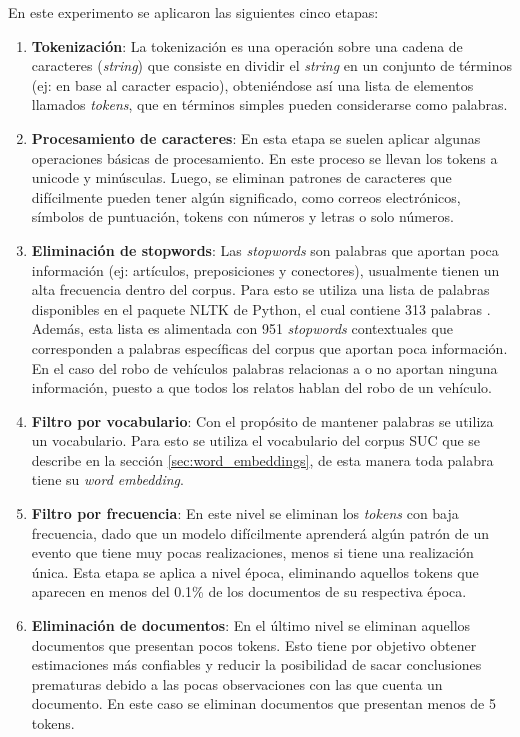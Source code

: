 En este experimento se aplicaron las siguientes cinco etapas:
\begin{enumerate}
  \item \textbf{Tokenización}: La tokenización es una operación sobre una cadena de caracteres (\textit{string}) que consiste en dividir el \textit{string} en un conjunto de términos (ej: en base al caracter espacio), obteniéndose así una lista de elementos llamados \textit{tokens}, que en términos simples pueden considerarse como palabras.
\item \textbf{Procesamiento de caracteres}: En esta etapa se suelen aplicar algunas operaciones básicas de procesamiento. En este proceso se llevan los tokens a unicode y minúsculas. Luego, se eliminan patrones de caracteres que difícilmente pueden tener algún significado, como correos electrónicos, símbolos de puntuación, tokens con números y letras o solo números. 
\item \textbf{Eliminación de stopwords}: Las \textit{stopwords} \citep{wilbur1992automatic} son palabras que aportan poca información (ej: artículos, preposiciones y conectores), usualmente tienen un alta frecuencia dentro del corpus. Para esto se utiliza una lista de palabras disponibles en el paquete NLTK de Python, el cual contiene 313 palabras \citep{bird2009natural}. Además, esta lista es alimentada con 951 \textit{stopwords} contextuales que corresponden a palabras específicas del corpus que aportan poca información. En el caso del robo de vehículos palabras relacionas a  o  no aportan ninguna información, puesto a que todos los relatos hablan del robo de un vehículo. 
\item \textbf{Filtro por vocabulario}: Con el propósito de mantener palabras  se utiliza un vocabulario. Para esto se utiliza el vocabulario del corpus SUC que se describe en la sección \ref{sec:word_embeddings}, de esta manera toda palabra tiene su \textit{word embedding}. 
\item \textbf{Filtro por frecuencia}: En este nivel se eliminan los \textit{tokens} con baja frecuencia, dado que un modelo difícilmente aprenderá algún patrón de un evento que tiene muy pocas realizaciones, menos si tiene una realización única. Esta etapa se aplica a nivel época, eliminando aquellos tokens que aparecen en menos del 0.1\% de los documentos de su respectiva época.
\item \textbf{Eliminación de documentos}: En el último nivel se eliminan aquellos documentos que presentan pocos tokens. Esto tiene por objetivo obtener estimaciones más confiables y reducir la posibilidad de sacar conclusiones prematuras debido a las pocas observaciones con las que cuenta un documento. En este caso se eliminan documentos que presentan menos de 5 tokens.
\end{enumerate}

